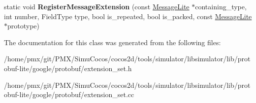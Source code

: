 \begin{DoxyCompactItemize}
\item 
\mbox{\label{classgoogle_1_1protobuf_1_1internal_1_1ExtensionSet_a524e423fae76daae569a0d6bb836846c}} 
static void {\bfseries Register\+Message\+Extension} (const \hyperlink{classgoogle_1_1protobuf_1_1MessageLite}{Message\+Lite} $\ast$containing\+\_\+type, int number, Field\+Type type, bool is\+\_\+repeated, bool is\+\_\+packed, const \hyperlink{classgoogle_1_1protobuf_1_1MessageLite}{Message\+Lite} $\ast$prototype)
\end{DoxyCompactItemize}


The documentation for this class was generated from the following files\+:\begin{DoxyCompactItemize}
\item 
/home/pmx/git/\+P\+M\+X/\+Simu\+Cocos/cocos2d/tools/simulator/libsimulator/lib/protobuf-\/lite/google/protobuf/extension\+\_\+set.\+h\item 
/home/pmx/git/\+P\+M\+X/\+Simu\+Cocos/cocos2d/tools/simulator/libsimulator/lib/protobuf-\/lite/google/protobuf/extension\+\_\+set.\+cc\end{DoxyCompactItemize}
